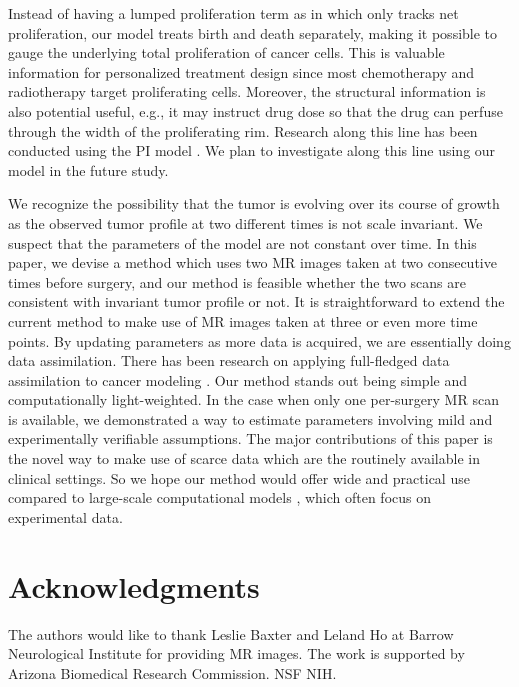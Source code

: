 \documentclass{aims}
\numberwithin{equation}{section}
\begin{document}
Instead of having a lumped proliferation term as in \cite{Jackson2015a}
which only tracks net proliferation, our model treats birth and death
separately, making it possible to gauge the underlying total proliferation
of cancer cells. This is valuable information for personalized treatment
design since most chemotherapy and radiotherapy target proliferating
cells. Moreover, the structural information is also potential useful,
e.g., it may instruct drug dose so that the drug can perfuse through
the width of the proliferating rim. Research along this line has been
conducted using the PI model \cite{Kim2017}. We plan to investigate
along this line using our model in the future study. 

We recognize the possibility that the tumor is evolving over its course
of growth as the observed tumor profile at two different times is
not scale invariant. We suspect that the parameters of the model are
not constant over time. In this paper, we devise a method which uses
two MR images taken at two consecutive times before surgery, and our
method is feasible whether the two scans are consistent with invariant
tumor profile or not. It is straightforward to extend the current
method to make use of MR images taken at three or even more time points.
By updating parameters as more data is acquired, we are essentially
doing data assimilation. There has been research on applying full-fledged
data assimilation to cancer modeling \cite{Kostelich2011,McDaniel2013}.
Our method stands out being simple and computationally light-weighted.
In the case when only one per-surgery MR scan is available, we demonstrated
a way to estimate parameters involving mild and experimentally verifiable
assumptions. The major contributions of this paper is the novel way
to make use of scarce data which are the routinely available in clinical
settings. So we hope our method would offer wide and practical use
compared to large-scale computational models \cite{Eikenberry2009,Rutter2017},
which often focus on experimental data. 



\section*{Acknowledgments}
The authors would like to thank Leslie Baxter and Leland Ho at Barrow
Neurological Institute for providing MR images. The work is supported
by Arizona Biomedical Research Commission. NSF NIH.
\end{document}
